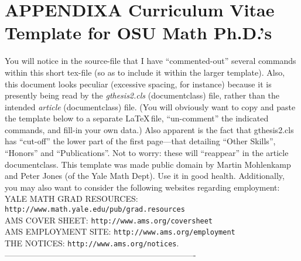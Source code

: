 \documentclass[11pt]{gthesis2}  %
\begin{document}
\section{APPENDIX\;\;\;A Curriculum Vitae Template for OSU Math Ph.D.'s}
\label{sec: Vitae Temp}
%
%
\indent You will notice in the source-file that I have
``commented-out'' several commands within this short tex-file (so
as to include it within the larger template). Also, this document
looks peculiar (excessive spacing, for instance) because it is
presently being read by the \emph{gthesis2.cls} (documentclass)
file, rather than the intended \emph{article} (documentclass)
file. (You will obviously want to copy and paste the template
below to a separate \LaTeX\,file, ``un-comment'' the indicated
commands, and fill-in your own data.) Also apparent is the fact
that gthesis2.cls has ``cut-off'' the lower part of the first
page---that detailing ``Other Skills'', ``Honors'' and ``Publications''.
 Not to worry: these will ``reappear'' in the article documentclass. This
template was made public domain by Martin Mohlenkamp and Peter Jones
(of the Yale Math Dept). Use it in good health. Additionally, you may also
want to consider the following websites regarding employment:
%
\\[.4cm]
%
YALE MATH GRAD RESOURCES:\;\;
\texttt{http://www.math.yale.edu/pub/grad.resources}\\
AMS COVER SHEET:\;\; \texttt{http://www.ams.org/coversheet}\\
AMS EMPLOYMENT SITE:\;\;  \texttt{http://www.ams.org/employment}\\
THE NOTICES:\;\; \texttt{http://www.ams.org/notices}\quad.\\
%
----------------------------------------------------------------------
%
%
%
%
%
\end{document}
